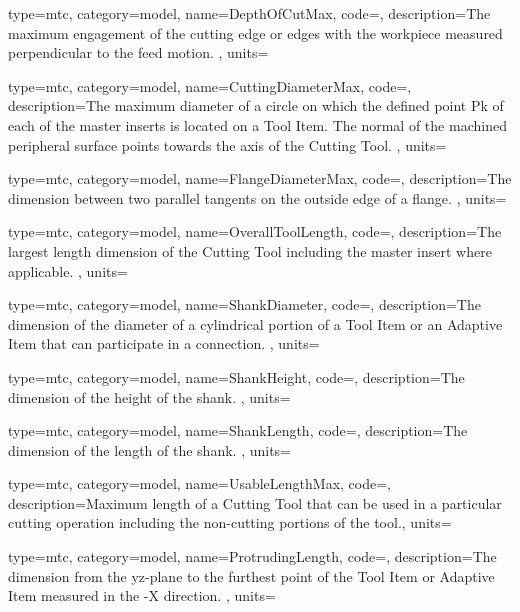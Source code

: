 {
  type=mtc,
  category=model,
  name={DepthOfCutMax},
  code=,
  description={The maximum engagement of the cutting edge or edges with the workpiece measured perpendicular to the feed motion. },
  units=
}


{
  type=mtc,
  category=model,
  name={CuttingDiameterMax},
  code=,
  description={The maximum diameter of a circle on which the defined point Pk of each of the master inserts is located on a Tool Item. The normal of the machined peripheral surface points towards the axis of the Cutting Tool. },
  units=
}


{
  type=mtc,
  category=model,
  name={FlangeDiameterMax},
  code=,
  description={The dimension between two parallel tangents on the outside edge of a flange. },
  units=
}


{
  type=mtc,
  category=model,
  name={OverallToolLength},
  code=,
  description={The largest length dimension of the Cutting Tool including the master insert where applicable.  },
  units=
}


{
  type=mtc,
  category=model,
  name={ShankDiameter},
  code=,
  description={The dimension of the diameter of a cylindrical portion of a Tool Item or an Adaptive Item that can participate in a connection. },
  units=
}


{
  type=mtc,
  category=model,
  name={ShankHeight},
  code=,
  description={The dimension of the height of the shank. },
  units=
}


{
  type=mtc,
  category=model,
  name={ShankLength},
  code=,
  description={The dimension of the length of the shank. },
  units=
}


{
  type=mtc,
  category=model,
  name={UsableLengthMax},
  code=,
  description={Maximum length of a Cutting Tool that can be used in a particular cutting operation including the non-cutting portions of the tool.},
  units=
}


{
  type=mtc,
  category=model,
  name={ProtrudingLength},
  code=,
  description={The dimension from the yz-plane to the furthest point of the Tool Item or Adaptive Item measured in the -X direction. },
  units=
}


